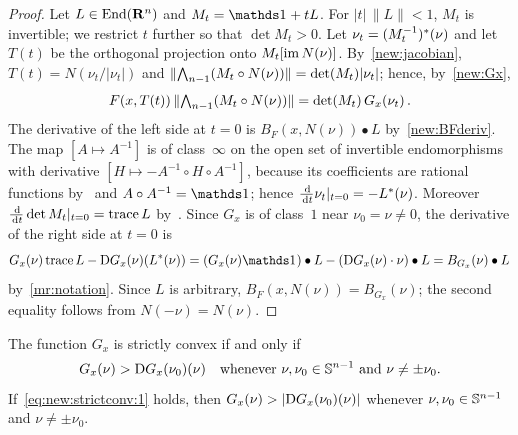 \documentclass[a4paper,twoside,leqno]{article}
\begin{document}
\begin{proof}
    Let $L \in \mathrm{End}({\mathbf{R}^{n}})$ and $M_t = \id{} + tL$. For $|t| \, \|L\| < 1$, $M_t$ is
    invertible; we restrict $t$ further so that $\det M_t > 0$. Let $\nu_t =
    (M_t^{-1})^{*}(\nu)$ and let $T(t)$ be the orthogonal projection onto $M_t[\operatorname{im}
    N(\nu)]$. By~\ref{new:jacobian}, $T(t) = N(\nu_t / |\nu_t|)$ and $\|{\textstyle\boldsymbol{\bigwedge}}_{{n-1}}(M_t
    \circ N(\nu))\| = \det(M_t) |\nu_t|$; hence, by~\ref{new:Gx},
    \begin{displaymath}
        F(x,T(t)) \, \|{\textstyle\boldsymbol{\bigwedge}}_{{n-1}}(M_t \circ N(\nu))\| = \det(M_t) \, G_x(\nu_t) \,.
    \end{displaymath}
    The derivative of the left side at $t = 0$ is $B_F(x,N(\nu)) \bullet L$ by~\ref{new:BFderiv}.
    The map $[ A \mapsto A^{-1} ]$ is of class~$\infty$ on the open set of invertible
    endomorphisms with derivative $[ H \mapsto - A^{-1} \circ H \circ A^{-1} ]$, because its
    coefficients are rational functions by~\cite[1.3.4]{Federer1969} and $A \circ A^{-1} =
    \id{}$; hence $\frac{\,\mathrm{d}}{\,\mathrm{d} t} \nu_t |_{t=0} = -L^{*}(\nu)$. Moreover $\frac{\,\mathrm{d}}{\,\mathrm{d}
    t} \det M_t |_{t=0} = \operatorname{trace} L$ by~\cite[2.2(1)]{Allard1972}. Since $G_x$ is of class~$1$
    near $\nu_0 = \nu \ne 0$, the derivative of the right side at $t = 0$ is
    \begin{displaymath}
        G_x(\nu) \trace L - \uD G_x(\nu)(\transpose{L}(\nu)) = (G_x(\nu) \id{}) \bullet L - (\uD
        G_x(\nu) \cdot \nu) \bullet L = B_{G_x}(\nu) \bullet L
    \end{displaymath}
    by~\ref{mr:notation}. Since $L$ is arbitrary, $B_F(x,N(\nu)) = B_{G_x}(\nu)$; the second
    equality follows from $N(-\nu) = N(\nu)$.
\end{proof}

\begin{lemma}
    \label{new:strictconv}
    The function $G_x$ is strictly convex if and only if
    \begin{equation}
        \label{eq:new:strictconv:1}
        G_x(\nu) > \mathrm{D} G_x(\nu_0)(\nu) \quad \text{whenever $\nu, \nu_0 \in \mathbb{S}^{n-1}$ and
        $\nu \ne \pm \nu_0$}.
    \end{equation}
    If~\eqref{eq:new:strictconv:1} holds, then $G_x(\nu) > |\mathrm{D} G_x(\nu_0)(\nu)|$ whenever $\nu,
    \nu_0 \in \mathbb{S}^{n-1}$ and $\nu \ne \pm \nu_0$.
\end{lemma}
\end{document}
